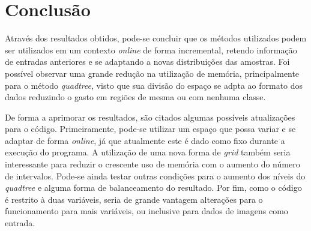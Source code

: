 \documentclass[conference]{IEEEtran}
\begin{document}
\section{Conclusão} \label{concl}

Através dos resultados obtidos, pode-se concluir que os métodos utilizados podem ser utilizados em um contexto \textit{online} de forma incremental, retendo informação de entradas anteriores e se adaptando a novas distribuições das amostras. Foi possível observar uma grande redução na utilização de memória, principalmente para o método \textit{quadtree}, visto que sua divisão do espaço se adpta ao formato dos dados reduzindo o gasto em regiões de mesma ou com nenhuma classe.

De forma a aprimorar os resultados, são citados algumas possíveis atualizações para o código. Primeiramente, pode-se utilizar um espaço que possa variar e se adaptar de forma \textit{online}, já que atualmente este é dado como fixo durante a execução do programa. A utilização de uma nova forma de \textit{grid} também seria interessante para reduzir o crescente uso de memória com o aumento do número de intervalos. Pode-se ainda testar outras condições para o aumento dos níveis do \textit{quadtree} e alguma forma de balanceamento do resultado. Por fim, como o código é restrito à duas variáveis, seria de grande vantagem alterações para o funcionamento para mais variáveis, ou inclusive para dados de imagens como entrada.




 \label{Ref}



\clearpage
\end{document}
